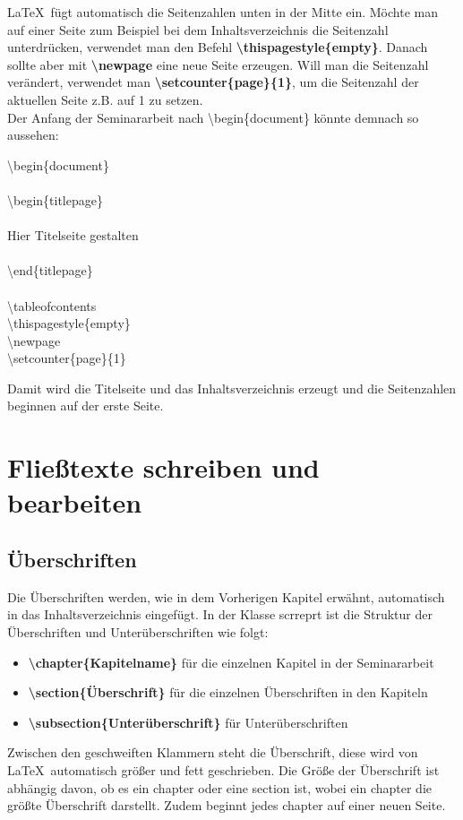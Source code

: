 \documentclass[a4paper, 12pt]{scrreprt}
\begin{document}
\LaTeX\, fügt automatisch die Seitenzahlen unten in der Mitte ein. Möchte man auf einer Seite zum Beispiel bei dem Inhaltsverzeichnis die Seitenzahl unterdrücken, verwendet man den Befehl \textbf{\textbackslash thispagestyle\{empty\}}. Danach sollte aber mit \textbf{\textbackslash newpage} eine neue Seite erzeugen. Will man die Seitenzahl verändert, verwendet man \textbf{\textbackslash setcounter\{page\}\{1\}}, um die Seitenzahl der aktuellen Seite z.B. auf 1 zu setzen.\\
Der Anfang der Seminararbeit nach \textbackslash begin\{document\} könnte demnach so aussehen:\\
\begin{addmargin}{0.5cm}
\textbackslash begin\{document\}\\
\hfill\\
\textbackslash begin\{titlepage\}\\
\hfill\\
Hier Titelseite gestalten\\
\hfill\\
\textbackslash end\{titlepage\}\\
\hfill\\
\textbackslash tableofcontents\\
\textbackslash thispagestyle\{empty\}\\
\textbackslash newpage\\
\textbackslash setcounter\{page\}\{1\}\\
\end{addmargin}
Damit wird die Titelseite und das Inhaltsverzeichnis erzeugt und die Seitenzahlen beginnen auf der erste Seite.

\chapter{Fließtexte schreiben und bearbeiten}
\section{Überschriften}
Die Überschriften werden, wie in dem Vorherigen Kapitel erwähnt, automatisch in das Inhaltsverzeichnis eingefügt. In der Klasse scrreprt ist die Struktur der Überschriften und Unterüberschriften wie folgt:
\begin{itemize}
\item \textbf{\textbackslash chapter\{Kapitelname\}} für die einzelnen Kapitel in der Seminararbeit
\item \textbf{\textbackslash section\{Überschrift\}} für die einzelnen Überschriften in den Kapiteln
\item \textbf{\textbackslash subsection\{Unterüberschrift\}} für Unterüberschriften
\end{itemize}
Zwischen den geschweiften Klammern steht die Überschrift, diese wird von \LaTeX\, automatisch größer und fett geschrieben. Die Größe der Überschrift ist abhängig davon, ob es ein chapter oder eine section ist, wobei ein chapter die größte Überschrift darstellt. Zudem beginnt jedes chapter auf einer neuen Seite. 
\end{document}
